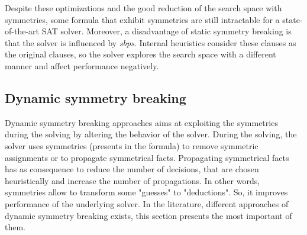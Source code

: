 Despite these optimizations and the good reduction of the search space with symmetries,
some formula that exhibit symmetries are still intractable for a state-of-the-art SAT solver.
Moreover, a disadvantage of static symmetry breaking is that the solver is influenced by \textit{sbps}.
Internal heuristics consider these clauses as the original clauses, so the solver explores
the search space with a different manner and affect performance negatively.


%
%
%
%



% 


\subsection{Dynamic symmetry breaking}


Dynamic symmetry breaking approaches aims at exploiting the symmetries during the solving by altering the behavior of the solver.
During the solving, the solver uses symmetries (presents in the formula) to remove symmetric assignments or to propagate symmetrical facts.
Propagating symmetrical facts has as consequence to reduce the number of decisions, that are chosen heuristically and increase the number of propagations.
In other words, symmetries allow to transform some "guesses" to "deductions". So, it improves performance of the underlying solver.
In the literature, different approaches of dynamic symmetry breaking exists, this section presents the most important of them.



